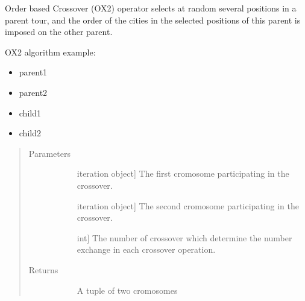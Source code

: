 \documentclass[letterpaper,10pt,english]{sphinxmanual}
\begin{document}
\begin{fulllineitems}
\label{\detokenize{pygace:pygace.ga.order_based_crossover}}
Order based Crossover (OX2) operator selects at random several positions
in a parent tour, and the order of the cities in the selected positions
of this parent is imposed on the other parent.

OX2 algorithm example:
\begin{itemize}
\item {} 
parent1 

\item {} 
parent2 

\item {} 
child1 

\item {} 
child2 

\end{itemize}
\begin{quote}\begin{description}
\item[{Parameters}] \leavevmode\begin{description}
\item[{}] \leavevmode{[}iteration object{]}
The first cromosome participating in the crossover.

\item[{}] \leavevmode{[}iteration object{]}
The second cromosome participating in the crossover.

\item[{}] \leavevmode{[}int{]}
The number of crossover which determine the number exchange in each
crossover operation.

\end{description}

\item[{Returns}] \leavevmode\begin{description}
\item[{}] \leavevmode
A tuple of two cromosomes


\end{description}
\end{description}
\end{quote}
\end{fulllineitems}
\end{document}

